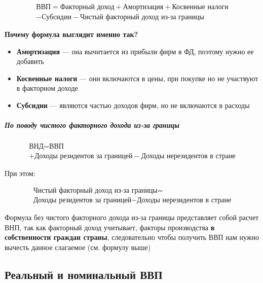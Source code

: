 \documentclass{article}
\begin{document}
    \begin{multline}
        \text{ВВП} = \text{Факторный доход} + \text{Амортизация} + \text{Косвенные налоги} \\
        - \text{Субсидии} - \text{Чистый факторный доход из-за границы}
    \end{multline}


    \textbf{Почему формула выглядит именно так?}

    \quad

    \begin{itemize}
        \item \textbf{Амортизация} --- она вычитается из прибыли фирм в ФД, поэтому нужно ее добавить
        \item \textbf{Косвенные налоги} --- они включаются в цены, при покупке но не участвуют в факторном доходе
        \item \textbf{Субсидии} --- являются частью доходов фирм, но не включаются в расходы
    \end{itemize}
    
    \subparagraph{По поводу чистого факторного дохода из-за границы}
    
    \begin{multline}
        \text{ВНД} = \text{ВВП} \\
        + \text{Доходы резидентов за границей}
        - \text{Доходы нерезидентов в стране}
    \end{multline}

    \quad

    При этом:

    \quad

    \begin{multline}
       \text{Чистый факторный доход из-за границы} = \\
       \text{Доходы резидентов за границей} - \text{Доходы нерезидентов в стране}
    \end{multline}

    \quad

    Формула без чистого факторного дохода из-за границы представляет собой расчет ВНП,
    так как факторный доход учитывает, факторы производства \textbf{в собственности граждан страны}, следовательно
    чтобы получить ВВП нам нужно вычесть данное слагаемое (см. формулу выше)

    \subsection{Реальный и номинальный ВВП}
\end{document}
